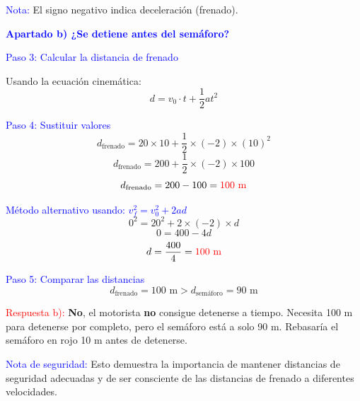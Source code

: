 \begin{exercise}
\begin{solu}
        \textcolor{blue}{Nota:} El signo negativo indica deceleración (frenado).

        \vspace{0.5cm}

        \textbf{\textcolor{blue}{Apartado b) ¿Se detiene antes del semáforo?}}

        \textcolor{blue}{Paso 3: Calcular la distancia de frenado}

        Usando la ecuación cinemática:
        \[
            \boxed{d = v_0 \cdot t + \frac{1}{2} a t^2}
        \]

        \textcolor{blue}{Paso 4: Sustituir valores}
        \[
            d_{\text{frenado}} = 20 \times 10 + \frac{1}{2} \times (-2) \times (10)^2
        \]
        \[
            d_{\text{frenado}} = 200 + \frac{1}{2} \times (-2) \times 100
        \]
        \[
            d_{\text{frenado}} = 200 - 100 = \textcolor{red}{100 \text{ m}}
        \]

        \textcolor{blue}{Método alternativo usando: $v_f^2 = v_0^2 + 2ad$}
        \[
            0^2 = 20^2 + 2 \times (-2) \times d
        \]
        \[
            0 = 400 - 4d
        \]
        \[
            d = \frac{400}{4} = \textcolor{red}{100 \text{ m}}
        \]

        \textcolor{blue}{Paso 5: Comparar las distancias}
        \[
            d_{\text{frenado}} = 100 \text{ m} > d_{\text{semáforo}} = 90 \text{ m}
        \]

        \textcolor{red}{Respuesta b):} \textbf{No}, el motorista \textbf{no} consigue detenerse a tiempo. Necesita 100 m para detenerse por completo, pero el semáforo está a solo 90 m. Rebasaría el semáforo en rojo 10 m antes de detenerse.

        \textcolor{blue}{Nota de seguridad:} Esto demuestra la importancia de mantener distancias de seguridad adecuadas y de ser consciente de las distancias de frenado a diferentes velocidades.
    \end{solu}
\end{exercise}



